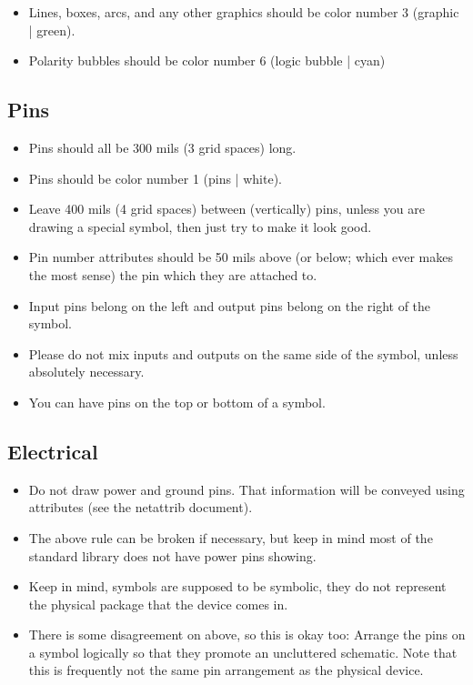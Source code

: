 \documentclass{article}
\begin{document}
\begin{itemize}
\item Lines, boxes, arcs, and any other graphics should be color number 3 
      (graphic | green).
\item Polarity bubbles should be color number 6 (logic bubble | cyan) 
\end{itemize}

\subsection{Pins}

\begin{itemize}
\item Pins should all be 300 mils (3 grid spaces) long.
\item Pins should be color number 1 (pins | white).
\item Leave 400 mils (4 grid spaces) between (vertically) pins, unless
      you are drawing a special symbol, then just try to make it look
      good.
\item Pin number attributes should be 50 mils above (or below; which
      ever makes the most sense) the pin which they are attached to.
\item Input pins belong on the left and output pins belong on the right of 
      the symbol.
\item Please do not mix inputs and outputs on the same side of the symbol,
      unless absolutely necessary. 
\item You can have pins on the top or bottom of a symbol.

\end{itemize}

\subsection{Electrical}

\begin{itemize}
\item Do not draw power and ground pins.  That information will be
      conveyed using attributes (see the netattrib document).
\item The above rule can be broken if necessary, but keep in mind most of
      the standard library does not have power pins showing.
\item Keep in mind, symbols are supposed to be symbolic, they do not represent
      the physical package that the device comes in.  
\item There is some disagreement on above, so this is okay too: Arrange
      the pins on a symbol logically so that they promote an uncluttered
      schematic.  Note that this is frequently not the same pin
      arrangement as the physical device.
\end{itemize}
\end{document}
